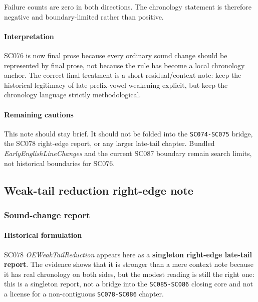 \documentclass[
  british,
  a4paper,
]{article}
\begin{document}
Failure counts are zero in both directions. The chronology statement is
therefore negative and boundary-limited rather than positive.

\paragraph{Interpretation}\label{interpretation-47}

SC076 is now final prose because every ordinary sound change should be
represented by final prose, not because the rule has become a local
chronology anchor. The correct final treatment is a short
residual/context note: keep the historical legitimacy of late
prefix-vowel weakening explicit, but keep the chronology language
strictly methodological.

\paragraph{Remaining cautions}\label{remaining-cautions-47}

This note should stay brief. It should not be folded into the
\texttt{SC074-SC075} bridge, the SC078 right-edge report, or any larger
late-tail chapter. Bundled \emph{EarlyEnglishLineChanges} and the
current SC087 boundary remain search limits, not historical boundaries
for SC076.

\subsection{Weak-tail reduction right-edge
note}\label{weak-tail-reduction-right-edge-note}

\subsubsection{Sound-change report}\label{sound-change-report-48}

\paragraph{Historical formulation}\label{historical-formulation-48}

SC078 \emph{OEWeakTailReduction} appears here as a \textbf{singleton
right-edge late-tail report}. The evidence shows that it is stronger
than a mere context note because it has real chronology on both sides,
but the modest reading is still the right one: this is a singleton
report, not a bridge into the \texttt{SC085-SC086} closing core and not
a license for a non-contiguous \texttt{SC078-SC086} chapter.
\end{document}
